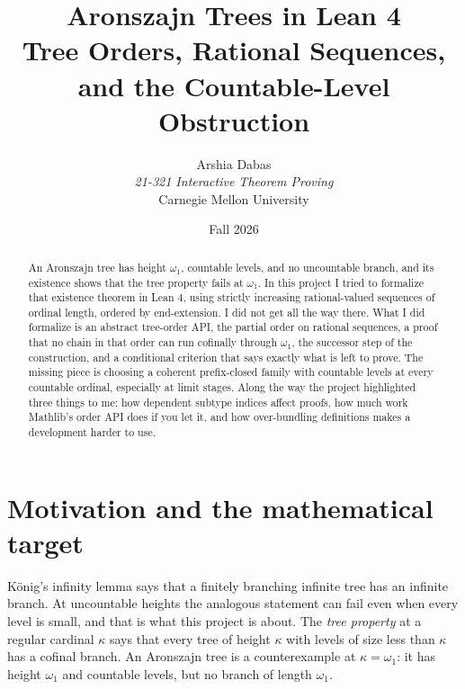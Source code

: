 \documentclass[10pt,letterpaper]{article}
\title{\vspace{-1.4em}\textbf{Aronszajn Trees in Lean 4}\\[2pt]\large Tree Orders, Rational Sequences, and the Countable-Level Obstruction}
\author{Arshia Dabas \\ 
\emph{21-321 Interactive Theorem Proving}\\Carnegie Mellon University}
\date{Fall 2026}
\newcommand{\wone}{\omega_1}
\begin{document}
\maketitle\vspace{-1.6em}

\begin{abstract}\noindent
An Aronszajn tree has height $\wone$, countable levels, and no uncountable branch, and its existence shows that the tree property fails at $\wone$. In this project I tried to formalize that existence theorem in Lean 4, using strictly increasing rational-valued sequences of ordinal length, ordered by end-extension. I did not get all the way there. What I did formalize is an abstract tree-order API, the partial order on rational sequences, a proof that no chain in that order can run cofinally through $\wone$, the successor step of the construction, and a conditional criterion that says exactly what is left to prove. The missing piece is choosing a coherent prefix-closed family with countable levels at every countable ordinal, especially at limit stages. Along the way the project highlighted three things to me: how dependent subtype indices affect proofs, how much work Mathlib's order API does if you let it, and how over-bundling definitions makes a development harder to use.
\end{abstract}

\section{Motivation and the mathematical target}
K\"onig's infinity lemma says that a finitely branching infinite tree has an infinite branch. At uncountable heights the analogous statement can fail even when every level is small, and that is what this project is about. The \emph{tree property} at a regular cardinal $\kappa$ says that every tree of height $\kappa$ with levels of size less than $\kappa$ has a cofinal branch. An Aronszajn tree is a counterexample at $\kappa=\wone$: it has height $\wone$ and countable levels, but no branch of length $\wone$.
\end{document}
